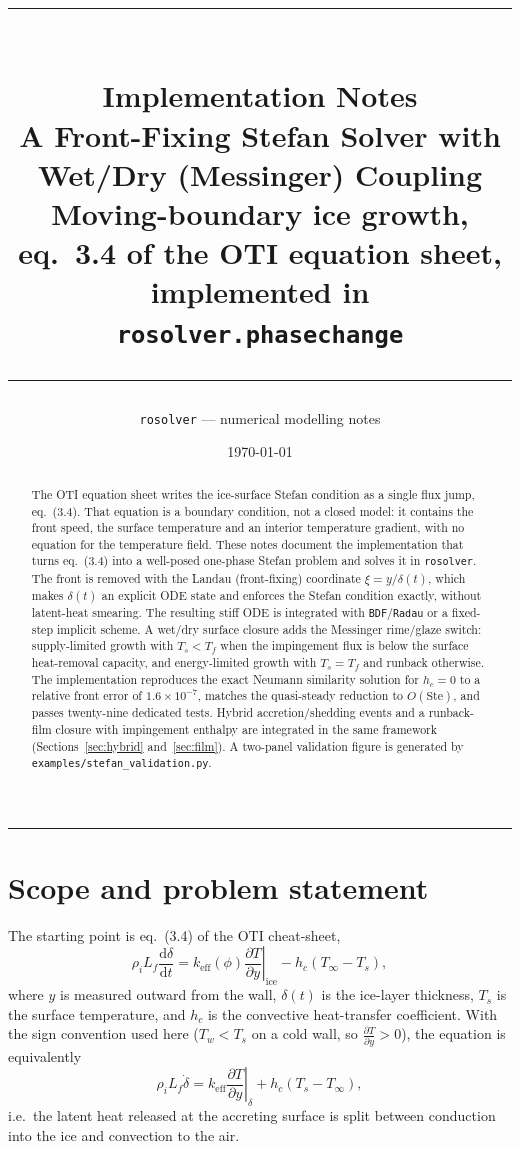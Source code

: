 \documentclass[11pt,a4paper]{article}
\title{
  {\color{navy}\rule{\textwidth}{1.8pt}}\\[0.6em]
  {\LARGE\bfseries\color{navy} Implementation Notes}\\[0.25em]
  {\Large\bfseries\color{navy} A Front-Fixing Stefan Solver with Wet/Dry (Messinger) Coupling}\\[0.35em]
  {\large\color{slate} Moving-boundary ice growth, eq.~3.4 of the OTI equation sheet,
   implemented in \texttt{rosolver.phasechange}}\\[0.4em]
  {\color{navy}\rule{\textwidth}{0.8pt}}
}
\author{\texttt{rosolver} --- numerical modelling notes}
\date{\today}
\newcommand{\dd}{\mathrm{d}}
\newcommand{\pd}[2]{\frac{\partial #1}{\partial #2}}
\newcommand{\td}[2]{\frac{\dd #1}{\dd #2}}
\newcommand{\Ts}{T_s}
\newcommand{\Tw}{T_w}
\newcommand{\Tinf}{T_\infty}
\newcommand{\Tf}{T_f}
\newcommand{\Lf}{L_f}
\newcommand{\keff}{k_{\mathrm{eff}}}
\begin{document}
\maketitle

\begin{abstract}
\noindent The OTI equation sheet writes the ice-surface Stefan condition as a single
flux jump, eq.~(3.4). That equation is a boundary condition, not a closed model: it
contains the front speed, the surface temperature and an interior temperature gradient,
with no equation for the temperature field. These notes document the implementation that
turns eq.~(3.4) into a well-posed one-phase Stefan problem and solves it in
\texttt{rosolver}. The front is removed with the Landau (front-fixing) coordinate
$\xi=y/\delta(t)$, which makes $\delta(t)$ an explicit ODE state and enforces the Stefan
condition exactly, without latent-heat smearing. The resulting stiff ODE is integrated
with \texttt{BDF}/\texttt{Radau} or a fixed-step implicit scheme. A wet/dry surface
closure adds the Messinger rime/glaze switch: supply-limited growth with $\Ts<\Tf$ when
the impingement flux is below the surface heat-removal capacity, and energy-limited
growth with $\Ts=\Tf$ and runback otherwise. The implementation reproduces the exact
Neumann similarity solution for $h_c=0$ to a relative front error of
$1.6\times10^{-7}$, matches the quasi-steady reduction to $O(\mathrm{Ste})$, and passes
twenty-nine dedicated tests. Hybrid accretion/shedding events and a runback-film closure
with impingement enthalpy are integrated in the same framework
(Sections~\ref{sec:hybrid} and~\ref{sec:film}). A two-panel validation figure is
generated by \texttt{examples/stefan\_validation.py}.
\end{abstract}

\tableofcontents
\vspace{0.6em}
\hrule
\vspace{0.8em}

\section{Scope and problem statement}

The starting point is eq.~(3.4) of the OTI cheat-sheet,
\begin{equation}\label{eq:stefan}
  \rho_i \Lf \td{\delta}{t}
  = \keff(\phi)\left.\pd{T}{y}\right|_{\text{ice}}
  - h_c\left(\Tinf-\Ts\right),
\end{equation}
where $y$ is measured outward from the wall, $\delta(t)$ is the ice-layer thickness,
$\Ts$ is the surface temperature, and $h_c$ is the convective heat-transfer coefficient.
With the sign convention used here ($\Tw<\Ts$ on a cold wall, so $\pd{T}{y}>0$), the
equation is equivalently
\begin{equation}
  \rho_i \Lf \dot\delta
  = \keff\left.\pd{T}{y}\right|_{\delta} + h_c\left(\Ts-\Tinf\right),
\end{equation}
i.e.\ the latent heat released at the accreting surface is split between conduction into
the ice and convection to the air.
\end{document}
